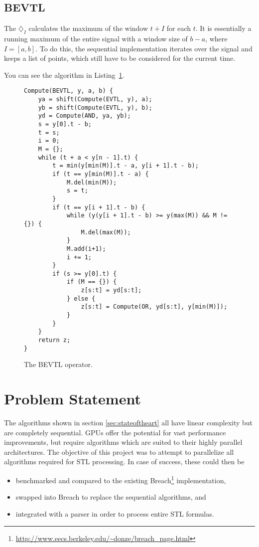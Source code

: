 \documentclass[a4paper,10pt]{article}
\newcommand{\Bevtl}{\diamondsuit_I}
\begin{document}
\subsection{BEVTL}

The $\Bevtl$ calculates the maximum of the window $t + I$ for each $t$. It is
essentially a running maximum of the entire signal with a window size of $b - a$,
where $I = [a,b]$. To do this, the sequential implementation iterates over the signal
and keeps a list of points, which still have to be considered for the current time.

You can see the algorithm in Listing~\ref{fig:bevtl}.

\begin{figure}[ht]
\begin{lstlisting}
Compute(BEVTL, y, a, b) {
    ya = shift(Compute(EVTL, y), a);
    yb = shift(Compute(EVTL, y), b);
    yd = Compute(AND, ya, yb);
    s = y[0].t - b;
    t = s;
    i = 0;
    M = {};
    while (t + a < y[n - 1].t) {
        t = min(y[min(M)].t - a, y[i + 1].t - b);
        if (t == y[min(M)].t - a) {
            M.del(min(M));
            s = t;
        }
        if (t == y[i + 1].t - b) {
            while (y(y[i + 1].t - b) >= y(max(M)) && M != {}) {
                M.del(max(M));
            }
            M.add(i+1);
            i += 1;
        }
        if (s >= y[0].t) {
            if (M == {}) {
                z[s:t] = yd[s:t];
            } else {
                z[s:t] = Compute(OR, yd[s:t], y[min(M)]);
            }
        }
    }
    return z;
}
\end{lstlisting}
\label{fig:bevtl}
\caption{The BEVTL operator.}
\end{figure}

\section{Problem Statement}

The algorithms shown in section \ref{sec:stateoftheart} all have linear complexity
but are completely sequential.
GPUs offer the potential for vast performance improvements, but require algorithms
which are suited to their highly parallel architectures. The objective of this project
was to attempt to parallelize all algorithms required for STL processing. In case of success, these could then be

\begin{itemize}
\item benchmarked and compared to the existing Breach\footnote{\url{http://www.eecs.berkeley.edu/~donze/breach_page.html}} implementation,
\item swapped into Breach to replace the sequential algorithms, and
\item integrated with a parser in order to process entire STL formulas.
\end{itemize}
\end{document}
